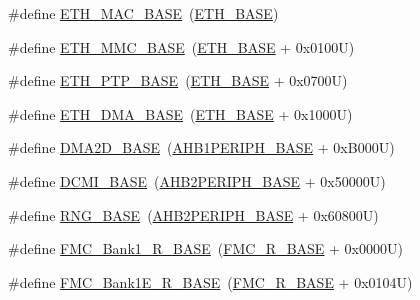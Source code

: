 \begin{DoxyCompactItemize}
\item 
\#define \hyperlink{group___peripheral__memory__map_ga3cf7005808feb61bff1fee01e50a711a}{E\+T\+H\+\_\+\+M\+A\+C\+\_\+\+B\+A\+SE}~(\hyperlink{group___peripheral__memory__map_gad965a7b1106ece575ed3da10c45c65cc}{E\+T\+H\+\_\+\+B\+A\+SE})
\item 
\#define \hyperlink{group___peripheral__memory__map_ga4946f2b3b03f7998343ac1778fbcf725}{E\+T\+H\+\_\+\+M\+M\+C\+\_\+\+B\+A\+SE}~(\hyperlink{group___peripheral__memory__map_gad965a7b1106ece575ed3da10c45c65cc}{E\+T\+H\+\_\+\+B\+A\+SE} + 0x0100\+U)
\item 
\#define \hyperlink{group___peripheral__memory__map_gaa0f60b922aeb7275c785cbaa8f94ecf0}{E\+T\+H\+\_\+\+P\+T\+P\+\_\+\+B\+A\+SE}~(\hyperlink{group___peripheral__memory__map_gad965a7b1106ece575ed3da10c45c65cc}{E\+T\+H\+\_\+\+B\+A\+SE} + 0x0700\+U)
\item 
\#define \hyperlink{group___peripheral__memory__map_gace2114e1b37c1ba88d60f3e831b67e93}{E\+T\+H\+\_\+\+D\+M\+A\+\_\+\+B\+A\+SE}~(\hyperlink{group___peripheral__memory__map_gad965a7b1106ece575ed3da10c45c65cc}{E\+T\+H\+\_\+\+B\+A\+SE} + 0x1000\+U)
\item 
\#define \hyperlink{group___peripheral__memory__map_gacec66385fd1604e69584eb19a0aaa303}{D\+M\+A2\+D\+\_\+\+B\+A\+SE}~(\hyperlink{group___peripheral__memory__map_ga811a9a4ca17f0a50354a9169541d56c4}{A\+H\+B1\+P\+E\+R\+I\+P\+H\+\_\+\+B\+A\+SE} + 0x\+B000\+U)
\item 
\#define \hyperlink{group___peripheral__memory__map_ga55b794507e021135486de57129a2505c}{D\+C\+M\+I\+\_\+\+B\+A\+SE}~(\hyperlink{group___peripheral__memory__map_gaeedaa71d22a1948492365e2cd26cfd46}{A\+H\+B2\+P\+E\+R\+I\+P\+H\+\_\+\+B\+A\+SE} + 0x50000\+U)
\item 
\#define \hyperlink{group___peripheral__memory__map_gab92662976cfe62457141e5b4f83d541c}{R\+N\+G\+\_\+\+B\+A\+SE}~(\hyperlink{group___peripheral__memory__map_gaeedaa71d22a1948492365e2cd26cfd46}{A\+H\+B2\+P\+E\+R\+I\+P\+H\+\_\+\+B\+A\+SE} + 0x60800\+U)
\item 
\#define \hyperlink{group___peripheral__memory__map_ga1d581e6f64ed2e5d97c11c58285a21b6}{F\+M\+C\+\_\+\+Bank1\+\_\+\+R\+\_\+\+B\+A\+SE}~(\hyperlink{group___peripheral__memory__map_ga7a599164cd92798542bc6288793d1ed5}{F\+M\+C\+\_\+\+R\+\_\+\+B\+A\+SE} + 0x0000\+U)
\item 
\#define \hyperlink{group___peripheral__memory__map_gad82d3a6bac014fa645fb67a63fae4bc0}{F\+M\+C\+\_\+\+Bank1\+E\+\_\+\+R\+\_\+\+B\+A\+SE}~(\hyperlink{group___peripheral__memory__map_ga7a599164cd92798542bc6288793d1ed5}{F\+M\+C\+\_\+\+R\+\_\+\+B\+A\+SE} + 0x0104\+U)

\end{DoxyCompactItemize}
